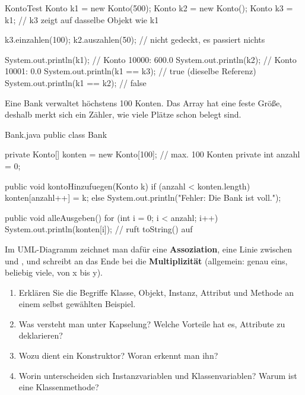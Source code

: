 \begin{javacode}[Ausschnitt]{KontoTest}
Konto k1 = new Konto(500);
Konto k2 = new Konto();
Konto k3 = k1;                      // k3 zeigt auf dasselbe Objekt wie k1

k3.einzahlen(100);
k2.auszahlen(50);                   // nicht gedeckt, es passiert nichts

System.out.println(k1);             // Konto 10000: 600.0
System.out.println(k2);             // Konto 10001: 0.0
System.out.println(k1 == k3);       // true  (dieselbe Referenz)
System.out.println(k1 == k2);       // false
\end{javacode}

Eine Bank verwaltet höchstens 100 Konten. Das Array hat eine feste Größe, deshalb merkt sich ein Zähler, wie viele Plätze schon belegt sind.
\begin{javacode}{Bank.java}
public class Bank {
	private Konto[] konten = new Konto[100];    // max. 100 Konten
	private int anzahl = 0;

	public void kontoHinzufuegen(Konto k) {
		if (anzahl < konten.length) {
			konten[anzahl++] = k;
		} else {
			System.out.println("Fehler: Die Bank ist voll.");
		}
	}

	public void alleAusgeben() {
		for (int i = 0; i < anzahl; i++) {
			System.out.println(konten[i]);      // ruft toString() auf
		}
	}
}
\end{javacode}
Im UML-Diagramm zeichnet man dafür eine \textbf{Assoziation}, eine Linie zwischen  und , und schreibt an das Ende bei  die \textbf{Multiplizität}  (allgemein:  genau eins, \code{*} beliebig viele,  von x bis y).

\aufgaben
{}
\begin{enumerate}[label=\alph*)]
\item Erklären Sie die Begriffe Klasse, Objekt, Instanz, Attribut und Methode an einem selbst gewählten Beispiel.
\item Was versteht man unter Kapselung? Welche Vorteile hat es, Attribute  zu deklarieren?
\item Wozu dient ein Konstruktor? Woran erkennt man ihn?
\item Worin unterscheiden sich Instanzvariablen und Klassenvariablen? Warum ist  eine Klassenmethode?
\end{enumerate}

